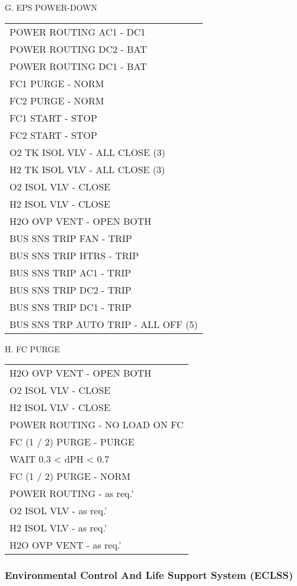 \documentclass[Orbiter User Manual.tex]{subfiles}
\begin{document}
\noindent
G. EPS POWER-DOWN
	\begin{longtable}{ p{\textwidth} }
	POWER ROUTING AC1 - DC1\\
	POWER ROUTING DC2 - BAT\\
	POWER ROUTING DC1 - BAT\\
	FC1 PURGE - NORM\\
	FC2 PURGE - NORM\\
	FC1 START - STOP\\
	FC2 START - STOP\\
	O2 TK ISOL VLV - ALL CLOSE (3)\\
	H2 TK ISOL VLV - ALL CLOSE (3)\\
	O2 ISOL VLV - CLOSE\\
	H2 ISOL VLV - CLOSE\\
	H2O OVP VENT - OPEN BOTH\\
	BUS SNS TRIP FAN - TRIP\\
	BUS SNS TRIP HTRS - TRIP\\
	BUS SNS TRIP AC1 - TRIP\\
	BUS SNS TRIP DC2 - TRIP\\
	BUS SNS TRIP DC1 - TRIP\\
	BUS SNS TRP AUTO TRIP - ALL OFF (5)
	\end{longtable}

\noindent
H. FC PURGE
	\begin{longtable}{ p{\textwidth} }
	H2O OVP VENT - OPEN BOTH\\
	O2 ISOL VLV - CLOSE\\
	H2 ISOL VLV - CLOSE\\
	POWER ROUTING - NO LOAD ON FC\\
	FC (1 / 2) PURGE - PURGE\\
	WAIT 0.3 < dPH < 0.7\\
	FC (1 / 2) PURGE - NORM\\
	POWER ROUTING - as req.'\\
	O2 ISOL VLV - as req.'\\
	H2 ISOL VLV - as req.'\\
	H2O OVP VENT - as req.'
	\end{longtable}


\subsubsection{Environmental Control And Life Support System (ECLSS)}
\end{document}
